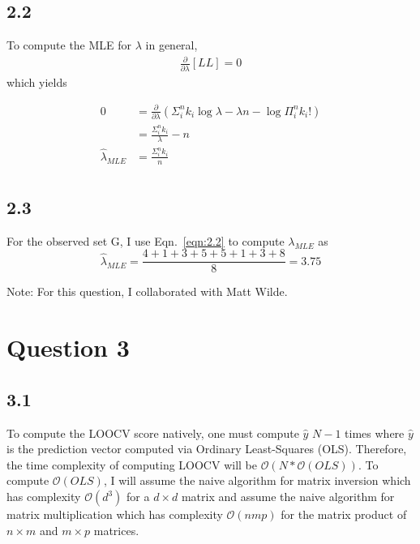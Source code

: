 \documentclass[12pt]{amsart}
\begin{document}
\subsection*{2.2}

To compute the MLE for $\lambda$ in general,
\begin{equation} 
\begin{split}
\frac{\partial}{\partial \lambda} \left[ LL \right] = 0
\end{split}
\end{equation}
which yields

\begin{equation} \label{eqn:2.2}
\begin{split}
0 & = \frac{\partial}{\partial \lambda} \left( \Sigma_i^n k_i \log \lambda - \lambda n - \log \Pi_i^n k_i ! \right) \\ 
& = \frac{\Sigma_i^n k_i}{\lambda} - n \\
\hat{\lambda}_{MLE} & = \frac{\Sigma_i^n k_i}{n} \\
\end{split}
\end{equation}

\subsection*{2.3}
For the observed set G, I use Eqn.~\ref{eqn:2.2} to compute $\lambda_{MLE}$ as
\begin{equation}
\hat{\lambda}_{MLE} = \frac{4+1+3+5+5+1+3+8}{8} = 3.75
\end{equation}

Note: For this question, I collaborated with Matt Wilde.


\section*{Question 3}

\subsection*{3.1}

To compute the LOOCV score natively, one must compute $\hat{y}$ $N-1$ times where $\hat{y}$ is the prediction vector computed via Ordinary Least-Squares (OLS).  Therefore, the time complexity of computing LOOCV will be $\mathcal{O}(N * \mathcal{O}(OLS))$.  To compute $\mathcal{O}(OLS)$, I will assume the naive algorithm for matrix inversion which has complexity $\mathcal{O}(d^3)$ for a $d \times d$ matrix and assume the naive algorithm for matrix multiplication which has complexity $\mathcal{O}(nmp)$ for the matrix product of $n \times m$ and $m \times p$ matrices.
\end{document}

